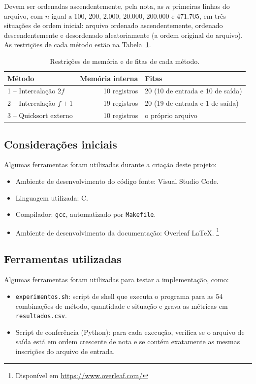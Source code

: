 \documentclass{article}
\begin{document}
Devem ser ordenadas ascendentemente, pela nota, as $n$ primeiras linhas do arquivo, com $n$ igual a 100, 200, 2.000, 20.000, 200.000 e 471.705, em três situações de ordem inicial: arquivo ordenado ascendentemente, ordenado descendentemente e desordenado aleatoriamente (a ordem original do arquivo). As restrições de cada método estão na Tabela~\ref{tab:restricoes}.

\begin{table}[!htb]
    \centering
    \small
    \begin{tabular}{|l|r|l|}
        \hline\hline
        Método & Memória interna & Fitas \\\hline
        1 -- Intercalação $2f$ & 10 registros & 20 (10 de entrada e 10 de saída) \\
        2 -- Intercalação $f+1$ & 19 registros & 20 (19 de entrada e 1 de saída) \\
        3 -- Quicksort externo & 10 registros & o próprio arquivo \\\hline\hline
    \end{tabular}
    \caption{\label{tab:restricoes}Restrições de memória e de fitas de cada método.}
\end{table}

\subsection{Considerações iniciais}

Algumas ferramentas foram utilizadas durante a criação deste projeto:

\begin{itemize}
  \item Ambiente de desenvolvimento do código fonte: Visual Studio Code.
  \item Linguagem utilizada: C.
  \item Compilador: \texttt{gcc}, automatizado por \texttt{Makefile}.
  \item Ambiente de desenvolvimento da documentação: Overleaf \LaTeX. \footnote{Disponível em \url{https://www.overleaf.com/}}
\end{itemize}

\subsection{Ferramentas utilizadas}
Algumas ferramentas foram utilizadas para testar a implementação, como:
\begin{itemize}
    \item[-] \texttt{experimentos.sh}: script de shell que executa o programa para as 54 combinações de método, quantidade e situação e grava as métricas em \texttt{resultados.csv}.
    \item[-] Script de conferência (Python): para cada execução, verifica se o arquivo de saída está em ordem crescente de nota e se contém exatamente as mesmas inscrições do arquivo de entrada.
\end{itemize}
\end{document}
